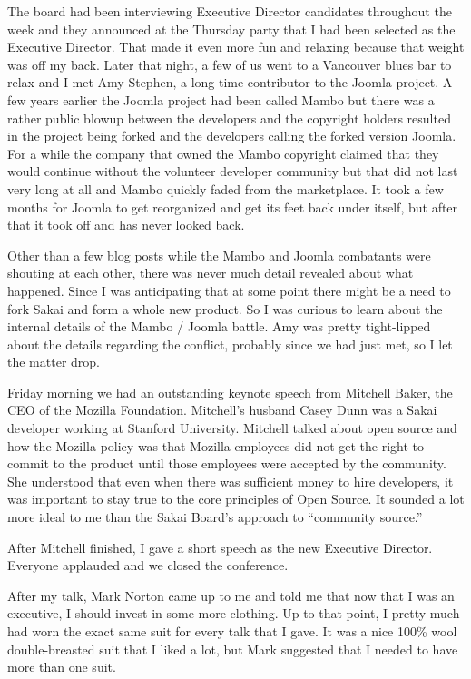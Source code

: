 \documentclass[12pt]{book}
\begin{document}
The board had been interviewing Executive Director candidates throughout the week and
they announced at the Thursday party that I had been selected as the Executive Director.
That made it even more fun and relaxing because that weight was off my back.  Later
that night, a few of us went to a Vancouver blues bar to relax and I met Amy Stephen,
a long-time contributor to the Joomla project.  A few years earlier the Joomla project
had been called Mambo but there was a rather public blowup between the developers
and the copyright holders resulted in the project being forked and the developers
calling the forked version Joomla.  For a while the company that owned the Mambo
copyright claimed that they would continue without the volunteer developer community
but that did not last very long at all and Mambo quickly faded from the marketplace.
It took a few months for Joomla to get reorganized and get its feet back under itself,
but after that it took off and has never looked back.

Other than a few blog posts while the Mambo and Joomla combatants were shouting
at each other, there was never much detail revealed about what happened.  Since
I was anticipating that at some point there might be a need to fork Sakai and form a whole
new product.
So I was curious to learn about the internal details of the Mambo / Joomla
battle.  Amy was pretty tight-lipped about the details regarding the conflict,
probably since we had just met, so I let the matter drop.

Friday morning we had an outstanding keynote speech from Mitchell Baker, the CEO
of the Mozilla Foundation.
Mitchell's husband Casey Dunn was a Sakai developer working at Stanford University.
Mitchell talked about open source
and how the Mozilla policy was that Mozilla employees
did not get the right to commit to the product until those employees were accepted
by the community.  She understood that even when there was sufficient money to hire
developers, it was important
to stay true to the core principles of Open Source.  It sounded a lot more
ideal to me than the Sakai Board's approach to ``community source.''

After Mitchell finished, I gave a short speech as the new Executive Director.
Everyone applauded and we closed the conference.

After my talk, Mark Norton came up to me and told me that now that I was an
executive, I should invest in some more clothing.  Up to that point, I pretty much
had worn the exact same suit for every talk that I gave.   It was a nice 100\% wool
double-breasted suit that I liked a lot, but Mark suggested that I needed to have
more than one suit.
\end{document}
